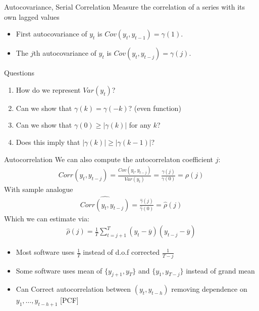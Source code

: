 \begin{frame}{Autocovariance, Serial Correlation}
Measure the correlation of a series with its own lagged values
\begin{itemize}
\item First \alert{autocovariance} of $y_t$ is $Cov(y_t,y_{t-1}) = \gamma(1)$.
\item The $j$th autocovariance of $y_t$ is $Cov(y_t,y_{t-j})=\gamma(j)$.
\end{itemize}
Questions
\begin{enumerate}
\item How do we represent $Var(y_t)$?
\item Can we show that $\gamma(k) = \gamma(-k)$? (even function)
\item Can we show that $\gamma(0) \geq |\gamma(k)|$ for any $k$?
\item Does this imply that $|\gamma(k)| \geq | \gamma(k-1)|$?
\end{enumerate}
\end{frame}

\begin{frame}{Autocorrelation}
\small
We can also compute the autocorrelaton coefficient $j$: 
\begin{align*}
Corr(y_t,y_{t-j}) = \frac{Cov(y_t,y_{t-j})}{Var(y_t)} = \frac{\gamma(j)}{\gamma(0)} = \rho(j)
\end{align*}
With sample analogue
\begin{align*}
\widehat{Corr(y_t,y_{t-j})} =  \frac{\widehat{\gamma}(j)}{\widehat{\gamma}(0)} = \widehat{\rho}(j)
\end{align*}
Which we can estimate via:
\begin{align*}
\widehat{\rho}(j)=  \frac{1}{T} \sum_{t=j+1}^T(y_t -\overline{y})(y_{t-j} - \overline{y})
\end{align*}
\begin{itemize}
\item Most software uses $\frac{1}{T}$ instead of d.o.f corrected $\frac{1}{T-j}$
\item Some software uses mean of $\{y_{j+1},y_T\}$ and $\{y_{1},y_{T-j}\}$ instead of grand mean
\item Can Correct autocorrelation between $(y_t,y_{t-h})$ removing dependence on $y_1,\ldots , y_{t-h+1}$ [PCF]
\end{itemize}
\end{frame}

